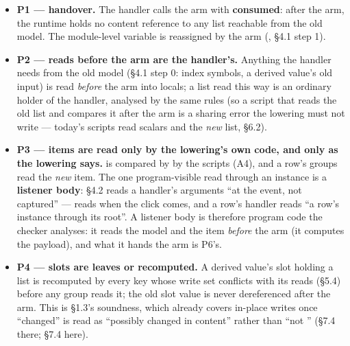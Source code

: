 \begin{itemize}
\item \textbf{P1 — handover.} The handler calls the arm with  \textbf{consumed}: after the arm, the runtime holds no content reference to any list reachable from the old model. The module-level  variable is reassigned by the arm (, §4.1 step 1).
\item \textbf{P2 — reads before the arm are the handler's.} Anything the handler needs from the old model (§4.1 step 0: index symbols, a derived value's old input) is read \emph{before} the arm into locals; a list read this way is an ordinary holder of the handler, analysed by the same rules (so a script that reads the old list and compares it after the arm is a sharing error the lowering must not write — today's scripts read scalars and the \emph{new} list, §6.2).
\item \textbf{P3 — items are read only by the lowering's own code, and only as the lowering says.}  is compared by \code{===} by the scripts (A4), and a row's groups read the \emph{new} item. The one program-visible read through an instance is a \textbf{listener body}:  §4.2 reads a handler's arguments “at the event, not captured” —  reads  when the click comes, and a row's handler reads “a row's instance through its root”. A listener body is therefore program code the checker analyses: it reads the model and the item \emph{before} the arm (it computes the payload), and what it hands the arm is P6's.
\item \textbf{P4 — slots are leaves or recomputed.} A derived value's slot holding a list is recomputed by every key whose write set conflicts with its reads (§5.4) before any group reads it; the old slot value is never dereferenced after the arm. This is  §1.3's soundness, which already covers in-place writes once “changed” is read as “possibly changed in content” rather than “not \code{===}” (§7.4 there; §7.4 here).

\end{itemize}
